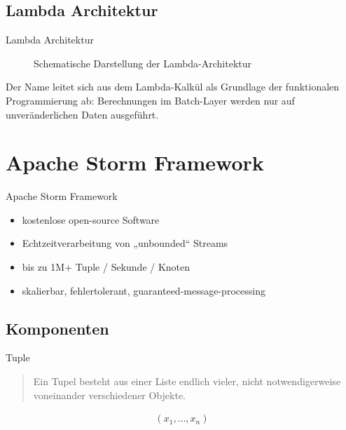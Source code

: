 \documentclass{beamer}
\begin{document}
\subsection{Lambda Architektur}
\begin{frame}[t]{Lambda Architektur}
\begin{figure}[h]
	\center
	\scalebox{.4}{}
	\caption{Schematische Darstellung der Lambda-Architektur}
	\label{fig:lambdaarch}
\end{figure}
  Der Name leitet sich aus dem Lambda-Kalkül als Grundlage der
  funktionalen Programmierung ab: Berechnungen im Batch-Layer werden
  nur auf unveränderlichen Daten ausgeführt.
\end{frame}

\section{Apache Storm Framework}
\begin{frame}[t]{Apache Storm Framework}
  \begin{itemize}
    \item kostenlose open-source Software
    \item Echtzeitverarbeitung von „unbounded“ Streams
    \item bis zu 1M+ Tuple / Sekunde / Knoten
    \item skalierbar, fehlertolerant, guaranteed-message-processing
  \end{itemize}
\end{frame}

\subsection{Komponenten}
\begin{frame}[t]{Tuple}
  \begin{quote}
    Ein Tupel besteht aus einer Liste endlich vieler, nicht notwendigerweise voneinander verschiedener Objekte.
  \end{quote}

  \begin{align*}
    (x_1, \ldots , x_n)
  \end{align*}
\end{frame}
\end{document}
